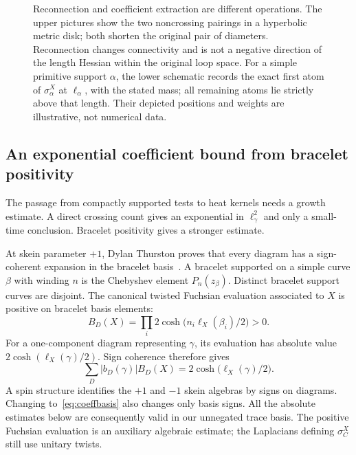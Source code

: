 \documentclass[11pt,a4paper]{article}
\numberwithin{equation}{section}
\theoremstyle{definition}
\theoremstyle{remark}
\begin{document}
\begin{figure}[htbp]
\caption[Crossing resolution and the first coefficient atom]{Reconnection and coefficient extraction are different operations.
The upper pictures show the two noncrossing pairings in a hyperbolic
metric disk; both shorten the original pair of diameters. Reconnection
changes connectivity and is not a negative direction of the length
Hessian within the original loop space. For a simple primitive support
$\alpha$, the lower schematic records the exact first atom of
$\sigma_\alpha^X$ at $\ell_\alpha$, with the stated mass; all remaining
atoms lie strictly above that length. Their depicted positions and
weights are illustrative, not numerical data.}
\label{fig:mono-reconnection-atoms}
\end{figure}

\subsection{An exponential coefficient bound from bracelet positivity}

The passage from compactly supported tests to heat kernels needs a
growth estimate. A direct crossing count gives an exponential in
$\ell_\gamma^2$ and only a small-time conclusion. Bracelet
positivity gives a stronger estimate.

At skein parameter $+1$, Dylan Thurston proves that every diagram
has a sign-coherent expansion in the bracelet
basis~\cite[Theorem 2]{DThurstonPositive}. A bracelet supported on
a simple curve $\beta$ with winding $n$ is the Chebyshev element
$P_n(z_\beta)$. Distinct bracelet support curves are disjoint.
The canonical twisted Fuchsian evaluation associated to $X$ is
positive on bracelet basis elements:
\[
 B_D(X)=\prod_i2\cosh\bigl(n_i\ell_X(\beta_i)/2\bigr)>0.
\]
For a one-component diagram representing $\gamma$, its evaluation
has absolute value $2\cosh(\ell_X(\gamma)/2)$. Sign coherence
therefore gives
\begin{equation}
 \sum_D |b_D(\gamma)| B_D(X)
 =2\cosh\bigl(\ell_X(\gamma)/2\bigr).
 \label{eq:coeffbraceletpositive}
\end{equation}
A spin structure identifies the $+1$ and $-1$ skein algebras by
signs on diagrams. Changing to~\eqref{eq:coeffbasis} also changes
only basis signs. All the absolute estimates below are consequently
valid in our unnegated trace basis. The positive Fuchsian evaluation
is an auxiliary algebraic estimate; the Laplacians defining
$\sigma_C^X$ still use unitary twists.
\end{document}
